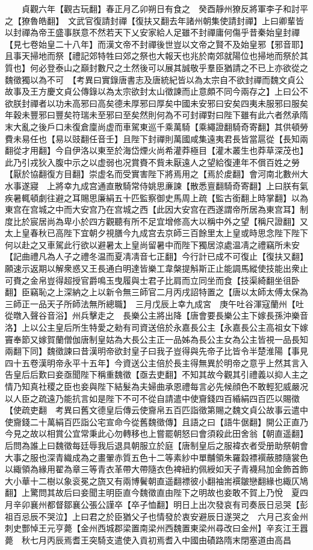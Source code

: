 　　貞觀六年【觀古玩翻】春正月乙卯朔日有食之　癸酉靜州獠反將軍李子和討平之【獠魯皓翻】　文武官復請封禪【復扶又翻去年諸州朝集使請封禪】上曰卿輩皆以封禪為帝王盛事朕意不然若天下乂安家給人足雖不封禪庸何傷乎昔秦始皇封禪【見七卷始皇二十八年】而漢文帝不封禪後世豈以文帝之賢不及始皇邪【邪音耶】且事天掃地而祭【禮記郊特牲曰郊之祭也大報天也兆於南郊就陽位也掃地而祭於其質也】何必登泰山之巔封數尺之土然後可以展其誠敬乎羣臣猶請之不已上亦欲從之魏徵獨以為不可　【考異曰實錄唐書志及唐統紀皆以為太宗自不欲封禪而魏文貞公故事及王方慶文貞公傳錄以為太宗欲封太山徵諫而止意頗不同今兩存之】上曰公不欲朕封禪者以功未高邪曰高矣德未厚邪曰厚矣中國未安邪曰安矣四夷未服邪曰服矣年穀未豐邪曰豐矣符瑞未至邪曰至矣然則何為不可封禪對曰陛下雖有此六者然承隋末大亂之後戶口未復倉廩尚虚而車駕東巡千乘萬騎【乘繩證翻騎奇寄翻】其供頓勞費未易任也【易以豉翻任音壬】且陛下封禪則萬國咸集遠夷君長皆當扈從【長知兩翻從才用翻】今自伊洛以東至於海岱煙火尚希灌莽極目【灌木叢生也莽草深茂也】此乃引戎狄入腹中示之以虚弱也况賞賚不貲未厭遠人之望給復連年不償百姓之勞【厭於協翻復方目翻】崇虚名而受實害陛下將焉用之【焉於䖍翻】會河南北數州大水事遂寢　上將幸九成宫通直散騎常侍姚思亷諫【散悉亶翻騎奇寄翻】上曰朕有氣疾暑輒頓劇往避之耳賜思廉絹五十匹監察御史馬周上疏【監古銜翻上時掌翻】以為東宫在宫城之中而大安宫乃在宫城之西【此因大安宫在西遂謂帝所居為東宫耳】制度比於宸居尚為卑小於四方觀聽有所不足宜增修高大以稱中外之望【稱尺證翻】又太上皇春秋已高陛下宜朝夕視膳今九成宫去京師三百餘里太上皇或時思念陛下陛下何以赴之又車駕此行欲以避暑太上皇尚留暑中而陛下獨居涼處温凊之禮竊所未安【記曲禮凡為人子之禮冬温而夏凊凊音七正翻】今行計已成不可復止【復扶又翻】願速示返期以解衆惑又王長通白明達皆樂工韋槃提斛斯正止能調馬縱使技能出衆止可賚之金帛豈得超授官爵鳴玉曳履與士君子比肩而立同坐而食【技渠綺翻坐徂卧翻】臣竊恥之上深納之上以新令無三師官二月丙戌詔特置之【唐以太師太傅太保為三師正一品天子所師法無所總職】　三月戊辰上幸九成宮　庚午吐谷渾寇蘭州【吐從暾入聲谷音浴】州兵擊走之　長樂公主將出降【唐會要長樂公主下嫁長孫沖樂音洛】上以公主皇后所生特愛之勑有司資送倍於永嘉長公主【永嘉長公主高祖女下嫁竇奉節又嫁賀蘭僧伽唐制皇姑為大長公主正一品姊為長公主女為公主皆視一品長知兩翻下同】魏徵諫曰昔漢明帝欲封皇子曰我子豈得與先帝子比皆令半楚淮陽【事見四十五卷漢明帝永平十五年】今資送公主倍於長主得無異於明帝之意乎上然其言入告皇后后歎曰妾亟聞陛下稱重魏徵【亟去吏翻】不知其故今觀其引禮義以抑人主之情乃知真社稷之臣也妾與陛下結髮為夫婦曲承恩禮每言必先候顔色不敢輕犯威嚴况以人臣之疏遠乃能抗言如是陛下不可不從自請遣中使齎錢四百緍絹四百匹以賜徵【使疏吏翻　考異曰舊文德皇后傳云使齎帛五百匹詣徵第賜之魏文貞公故事云遣中使齎錢二十萬絹百匹詣公宅宣命今從舊魏徵傳】且語之曰【語牛倨翻】開公正直乃今見之故以相賞公宜常秉此心勿轉移也上嘗罷朝怒曰會須殺此田舍翁【朝直遥翻】后問為誰上曰魏徵每廷辱我后退具朝服立於庭【唐制皇后之服褘衣者受册助祭朝會大事之服也深青織成為之畫翬赤質五色十二等素紗中單黼領朱羅縠褾襈蔽膝隨裳色以緅領為緣用翟為章三等青衣革帶大帶隨衣色裨紐約佩綬如天子青襪舄加金飾首飾大小華十二樹以象衮冕之旒又有兩博鬢朝直遥翻褾彼小翻袖耑襈皺戀翻緣也緅仄鳩翻】上驚問其故后曰妾聞主明臣直今魏徵直由陛下之明故也妾敢不賀上乃悅　夏四月辛卯襄州都督鄒襄公張公謹卒【卒子恤翻】明日上出次發哀有司奏辰日忌哭【彭祖百忌辰不哭泣】上曰君之於臣猶父子也情發於衷安避辰日遂哭之　六月己亥金州刺史酆悼王元亨薨【金州西城郡梁置南梁州西魏置東梁州尋改曰金州】辛亥江王囂薨　秋七月丙辰焉耆王突騎支遣使入貢初焉耆入中國由磧路隋末閉塞道由高昌
